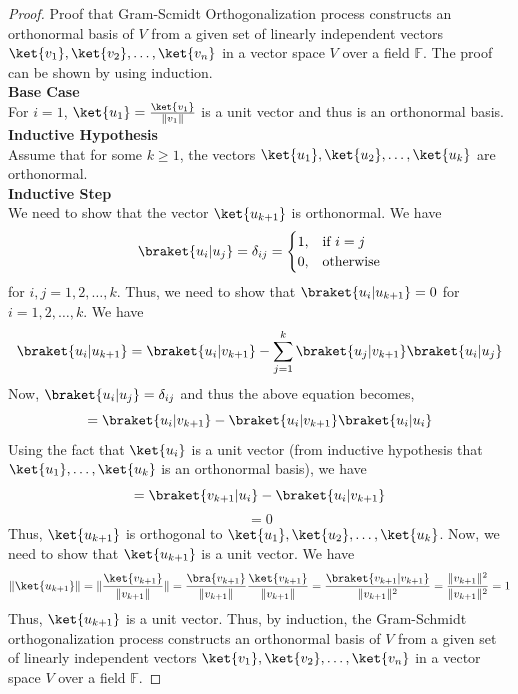 \documentclass[12pt, oneside]{book}
\theoremstyle{definition}
\theoremstyle{definition}
\theoremstyle{remark}
\begin{document}
\begin{proof}
    Proof that Gram-Scmidt Orthogonalization process constructs an orthonormal basis of $V$ from a given set of linearly independent vectors $\ket{v_1},\ket{v_2},\ldots,\ket{v_n}$ in a vector space $V$ over a field $\mathbb{F}$.
    The proof can be shown by using induction.\\
    \textbf{Base Case}\\
    For $i=1$, $\ket{u_1}=\frac{\ket{v_1}}{\|v_1\|}$ is a unit vector and thus is an orthonormal basis.\\
    \textbf{Inductive Hypothesis}\\
    Assume that for some $k\geq 1$, the vectors $\ket{u_1},\ket{u_2},\ldots,\ket{u_k}$ are orthonormal.\\
    \textbf{Inductive Step}\\
    We need to show that the vector $\ket{u_{k+1}}$ is orthonormal. We have
    \[
        \braket{u_i|u_j}=\delta_{ij}=
        \begin{cases}
            1, & \text{if } i=j\\
            0, & \text{otherwise}
        \end{cases}
    \]
    for $i,j=1,2,\ldots,k$. Thus, we need to show that $\braket{u_i|u_{k+1}}=0$ for $i=1,2,\ldots,k$. We have
    \[
        \braket{u_i|u_{k+1}}=\braket{u_i|v_{k+1}}-\sum_{j=1}^{k}\braket{u_j|v_{k+1}}\braket{u_i|u_j}
    \]
    Now, $\braket{u_i|u_j}=\delta_{ij}$ and thus the above equation becomes,
    \[
        =\braket{u_i|v_{k+1}}-\braket{u_i|v_{k+1}}\braket{u_i|u_i}
    \]
    Using the fact that $\ket{u_i}$ is a unit vector (from inductive hypothesis that $\ket{u_1}, \ldots, \ket{u_k}$ is an orthonormal basis), we have
    \[
        =\braket{v_{k+1}|u_i}-\braket{u_i|v_{k+1}}
    \]
    \[
        =0
    \]
    Thus, $\ket{u_{k+1}}$ is orthogonal to $\ket{u_1},\ket{u_2},\ldots,\ket{u_k}$. Now, we need to show that $\ket{u_{k+1}}$ is a unit vector. We have
    \[
        \|\ket{u_{k+1}}\|=\|\frac{\ket{v_{k+1}}}{\|v_{k+1}\|}\|=\frac{\bra{v_{k+1}}}{\|v_{k+1}\|}\frac{\ket{v_{k+1}}}{\|v_{k+1}\|}=\frac{\braket{v_{k+1}|v_{k+1}}}{\|v_{k+1}\|^2}=\frac{\|v_{k+1}\|^2}{\|v_{k+1}\|^2}=1
    \]
    Thus, $\ket{u_{k+1}}$ is a unit vector. Thus, by induction, the Gram-Schmidt orthogonalization process constructs an orthonormal basis of $V$ from a given set of linearly independent vectors $\ket{v_1},\ket{v_2},\ldots,\ket{v_n}$ in a vector space $V$ over a field $\mathbb{F}$.

\end{proof}
\end{document}
